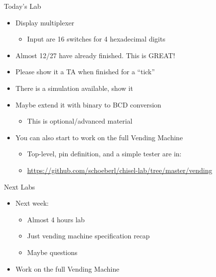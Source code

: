 \begin{frame}[fragile]{Today's Lab}
\begin{itemize}
\item Display multiplexer
\begin{itemize}
\item Input are 16 switches for 4 hexadecimal digits
\end{itemize}
\item Almost 12/27 have already finished. This is GREAT!
\item Please show it a TA when finished for a ``tick''
\item There is a simulation available, show it
\item Maybe extend it with binary to BCD conversion
\begin{itemize}
\item This is optional/advanced material
\end{itemize}
\item You can also start to work on the full Vending Machine
\begin{itemize}
\item Top-level, pin definition, and a simple tester are in:
\item \url{https://github.com/schoeberl/chisel-lab/tree/master/vending}
\end{itemize}
\end{itemize}
\end{frame}


\begin{frame}[fragile]{Next Labs}
\begin{itemize}
\item Next week:
\begin{itemize}
\item Almost 4 hours lab
\item Just vending machine specification recap
\item Maybe questions
\end{itemize}
\item Work on the full Vending Machine
\end{itemize}
\end{frame}



